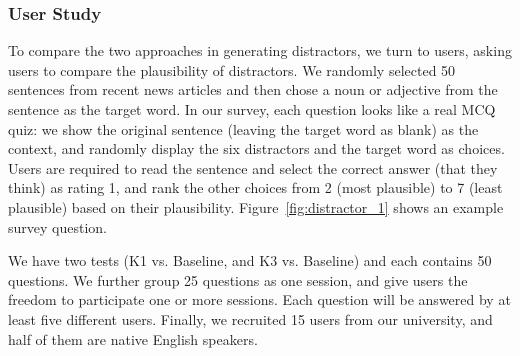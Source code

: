 


\subsubsection{User Study}
To compare the two approaches in generating distractors, we turn to users, asking users to compare the plausibility of distractors.
 We randomly selected 50 sentences from recent news articles and then chose a noun or adjective from the sentence as the target word. In our survey, each question looks like a real MCQ quiz: we show the original sentence (leaving the target word as blank) as the context,  and randomly display the six distractors and the target word as choices. Users are required to read the sentence and select the correct answer (that they think) as rating 1, and 
 rank the other choices from 2 (most plausible) to 7 (least plausible) based on their plausibility. Figure~\ref{fig:distractor_1} shows an example survey question.
 

We have two tests (K1  vs. Baseline, and K3  vs. Baseline) and each contains 50 questions. We further group 25 questions as one session, and give users the freedom to participate one or more sessions. Each question will be answered by at least five different users.
Finally, we recruited 15 users from our university, and half of them are native English speakers. 



